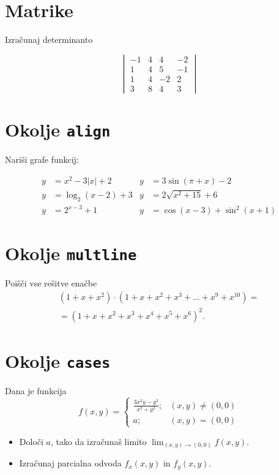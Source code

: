 \documentclass[a4paper,12pt]{article}
\begin{document}
\section*{Matrike}
Izračunaj determinanto
   
\[   
   \begin{vmatrix}
      -1 & 4 & 4 & -2 \\
      1 & 4 & 5 & -1 \\
      1 & 4 & -2 & 2 \\
      3 & 8 & 4 & 3 
   \end{vmatrix}
\]

\section*{Okolje \texttt{align}}
Nariši grafe funkcij:

\begin{align*}
      y &= x^2 - 3|x| + 2 & y &= 3 \sin(\pi+x) - 2 \\
      y &= \log_2(x-2) + 3 & y &= 2 \sqrt{x^2+15} + 6 \\
      y &= 2^{x-3} + 1 & y &= \cos(x-3) + \sin^2(x+1)
\end{align*}


\section*{Okolje \texttt{multline}}
Poišči vse rešitve enačbe
\begin{multline*}
   (1+x+x^2) \cdot (1+x+x^2+x^3+\ldots+x^9+x^{10}) = \\
   =(1+x+x^2+x^3+x^4+x^5+x^6)^2.
\end{multline*}

\section*{Okolje \texttt{cases}}
Dana je funkcija
   \[
   f(x,y)=
      \begin{cases}
         \frac{3x^2y-y^3}{x^2+y^2}; &(x,y)\neq (0,0) \\
         a; & (x,y)=(0,0)
      \end{cases}
   \]

\begin{itemize}
\item Določi \(a\), tako da izračunaš limito \( \lim_{(x,y)\to(0,0)} f(x,y) \).
\item Izračunaj parcialna odvoda \(f_x(x,y)\) in \(f_y(x,y)\).
\end{itemize}
\end{document}
